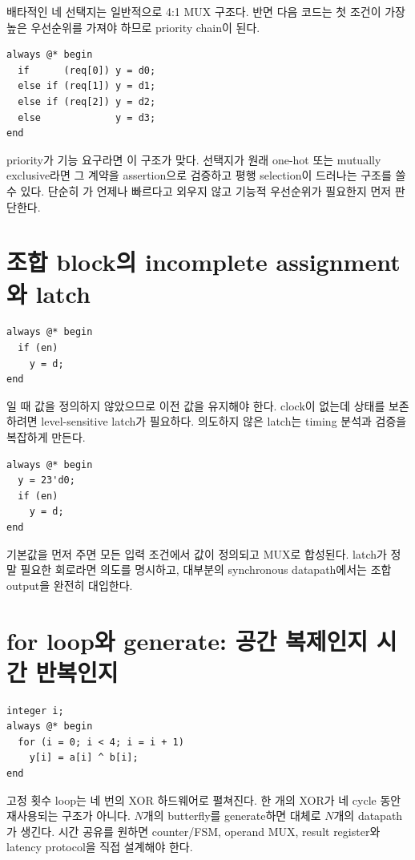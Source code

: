 배타적인 네 선택지는 일반적으로 4:1 MUX 구조다. 반면 다음 코드는 첫 조건이
가장 높은 우선순위를 가져야 하므로 priority chain이 된다.

\begin{lstlisting}
always @* begin
  if      (req[0]) y = d0;
  else if (req[1]) y = d1;
  else if (req[2]) y = d2;
  else             y = d3;
end
\end{lstlisting}

priority가 기능 요구라면 이 구조가 맞다. 선택지가 원래 one-hot 또는 mutually
exclusive라면 그 계약을 assertion으로 검증하고 평행 selection이 드러나는
구조를 쓸 수 있다. 단순히 가 언제나 빠르다고 외우지 않고 기능적
우선순위가 필요한지 먼저 판단한다.

\section{조합 block의 incomplete assignment와 latch}

\begin{lstlisting}
always @* begin
  if (en)
    y = d;
end
\end{lstlisting}

일 때  값을 정의하지 않았으므로 이전 값을 유지해야 한다.
clock이 없는데 상태를 보존하려면 level-sensitive latch가 필요하다. 의도하지 않은
latch는 timing 분석과 검증을 복잡하게 만든다.

\begin{lstlisting}
always @* begin
  y = 23'd0;
  if (en)
    y = d;
end
\end{lstlisting}

기본값을 먼저 주면 모든 입력 조건에서 값이 정의되고 MUX로 합성된다. latch가
정말 필요한 회로라면 의도를 명시하고, 대부분의 synchronous datapath에서는
조합 output을 완전히 대입한다.

\section{for loop와 generate: 공간 복제인지 시간 반복인지}

\begin{lstlisting}
integer i;
always @* begin
  for (i = 0; i < 4; i = i + 1)
    y[i] = a[i] ^ b[i];
end
\end{lstlisting}

고정 횟수 loop는 네 번의 XOR 하드웨어로 펼쳐진다. 한 개의 XOR가 네 cycle 동안
재사용되는 구조가 아니다. $N$개의 butterfly를 generate하면 대체로 $N$개의
datapath가 생긴다. 시간 공유를 원하면 counter/FSM, operand MUX, result register와
latency protocol을 직접 설계해야 한다.

